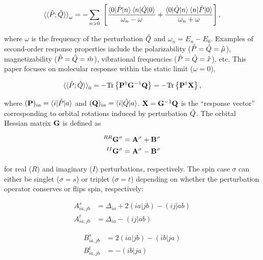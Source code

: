 \begin{equation}
  \braket{\braket{\hat{P}; \hat{Q}}}_{\omega}
  =
  - \sum_{n > 0} \;
    \left[
      \frac{\braket{0|\hat{P}|n} \braket{n|\hat{Q}|0}}{\omega_{n} - \omega}
    + \frac{\braket{0|\hat{Q}|n} \braket{n|\hat{P}|0}}{\omega_{n} + \omega}
    \right],
\end{equation}

where \(\omega\) is the frequency of the perturbation \(\hat{Q}\) and \(\omega_{n} = E_{n} - E_{0}\). Examples of second-order response properties include the polarizability (\(\hat{P} = \hat{Q} = \hat{\mu}\)), magnetizability (\(\hat{P} = \hat{Q} = \hat{m}\)), vibrational frequencies (\(\hat{P} = \hat{Q} = \hat{x}\)), etc. This paper focuses on molecular response within the static limit (\(\omega = 0\)),

\begin{equation}
  \braket{\braket{\hat{P}; \hat{Q}}}_{0}
  =
  - {\mathrm{Tr}}\left\{\mathbf{P}^{\dagger} \mathbf{G}^{-1} \mathbf{Q}\right\}
  =
  - {\mathrm{Tr}}\left\{\mathbf{P}^{\dagger} \mathbf{X}\right\},
\end{equation}

where \((\mathbf{P})_{ia} = \braket{i|\hat{P}|a}\) and \((\mathbf{Q})_{ia} = \braket{i|\hat{Q}|a}\). \(\mathbf{X} = \mathbf{G}^{-1} \mathbf{Q}\) is the ``response vector'' corresponding to orbital rotations induced by perturbation \(\hat{Q}\). The orbital Hessian matrix \(\mathbf{G}\) is defined as

\begin{equation}
  \begin{aligned}
    ^{RR}\mathbf{G}^{\sigma} &= \mathbf{A}^{\sigma} + \mathbf{B}^{\sigma} \\
    ^{II}\mathbf{G}^{\sigma} &= \mathbf{A}^{\sigma} - \mathbf{B}^{\sigma}
  \end{aligned}
\end{equation}

for real (\(R\)) and imaginary (\(I\)) perturbations, respectively\cite{doi:10.1080/00268976.2015.1024182}. The spin case \(\sigma\) can either be singlet (\(\sigma = s\)) or triplet (\(\sigma = t\)) depending on whether the perturbation operator conserves or flips spin, respectively:

\begin{equation}
  \begin{aligned}
    A^{s}_{ia,jb} &= \Delta_{ia} + 2(ia|jb) - (ij|ab) \\
    A^{t}_{ia,jb} &= \Delta_{ia} - (ij|ab)
  \end{aligned}
\end{equation}

\begin{equation}
  \begin{aligned}
    B^{s}_{ia,jb} &= 2(ia|jb) - (ib|ja) \\
    B^{t}_{ia,jb} &= - (ib|ja)
  \end{aligned}
\end{equation}

